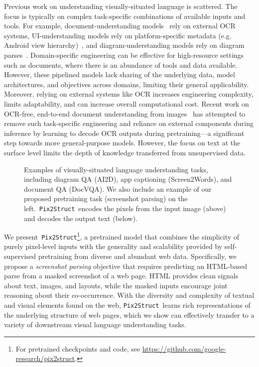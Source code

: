 \documentclass{article} %
\newcommand\ourmodel{{\texttt{Pix2Struct}}}
\begin{document}
Previous work on understanding visually-situated language is scattered. The focus is typically on complex task-specific combinations of available inputs and tools. For example, document-understanding models~\citep{layoutlmv3} rely on external OCR systems, UI-understanding models rely on platform-specific metadata (e.g. Android view hierarchy)~\citep{uibert}, and diagram-understanding models rely on diagram parses~\citep{kembhavi2016diagram}. Domain-specific engineering can be effective for high-resource settings such as documents, where there is an abundance of tools and data available. However, these pipelined models lack sharing of the underlying data, model architectures, and objectives across domains, limiting their general applicability. Moreover, relying on external systems like OCR increases engineering complexity, limits adaptability, and can increase overall computational cost. Recent work on OCR-free, end-to-end document understanding from images~\citep{donut, dessurt} has attempted to remove such task-specific engineering and reliance on external components during inference by learning to decode OCR outputs during pretraining---a significant step towards more general-purpose models. However, the focus on text at the surface level limits the depth of knowledge transferred from unsupervised data. 

\begin{figure}[!t]
\centering

\caption{Examples of visually-situated language understanding tasks, including diagram QA (AI2D), app captioning (Screen2Words), and document QA (DocVQA). We also include an example of our proposed pretraining task (screenshot parsing) on the left.~\ourmodel~encodes the pixels from the input image (above) and decodes the output text (below).}
\vspace{-10pt}
\label{fig:tasks}
\end{figure}

We present~\ourmodel\footnote{For pretrained checkpoints and code, see \url{https://github.com/google-research/pix2struct}.}, a pretrained model that combines the simplicity of purely pixel-level inputs with the generality and scalability provided by self-supervised pretraining from diverse and abundant web data. Specifically, we propose a \emph{screenshot parsing} objective that requires predicting an HTML-based parse from a masked screenshot of a web page. HTML provides clean signals about text, images, and layouts, while the masked inputs encourage joint reasoning about their co-occurrence. With the diversity and complexity of textual and visual elements found on the web, \ourmodel~learns rich representations of the underlying structure of web pages, which we show can effectively transfer to a variety of downstream visual language understanding tasks.
\end{document}

